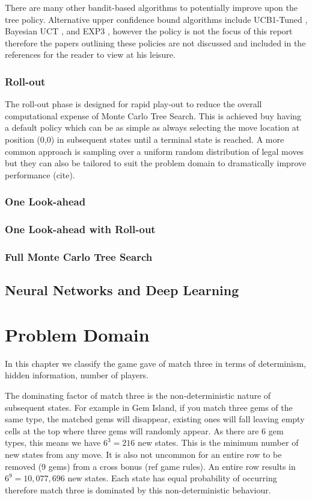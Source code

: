 \documentclass{bhamthesis}
\theoremstyle{definition}
\begin{document}
There are many other bandit-based algorithms to potentially improve upon the tree policy. Alternative upper confidence bound algorithms include UCB1-Tuned \cite{Auer2002}, Bayesian UCT \cite{Grunwald2010}, and EXP3 \cite{Auer1995} \cite{Audibert2009}, however the policy is not the focus of this report therefore the papers outlining these policies are not discussed and included in the references for the reader to view at his leisure.

\subsection{Roll-out}\label{s:rollOut}
The roll-out phase is designed for rapid play-out to reduce the overall computational expense of Monte Carlo Tree Search. This is achieved buy having a default policy which can be as simple as always selecting the move location at position (0,0) in subsequent states until a terminal state is reached. A more common approach is sampling over a uniform random distribution of legal moves but they can also be tailored to suit the problem domain to dramatically improve performance (cite).
\subsection{One Look-ahead}
\subsection{One Look-ahead with Roll-out}
\subsection{Full Monte Carlo Tree Search}
\section{Neural Networks and Deep Learning}


\chapter{Problem Domain}\label{ch:pb}
In this chapter we classify the game gave of match three in terms of determinism, hidden information, number of players.

The dominating factor of match three is the non-deterministic nature of subsequent states. For example in Gem Island, if you match three gems of the same type, the matched gems will disappear, existing ones will fall leaving empty cells at the top where three gems will randomly appear. As there are 6 gem types, this means we have $6^3 = 216$ new states. This is the minimum number of new states from any move. It is also not uncommon for an entire row to be removed (9 gems) from a cross bonus (ref game rules). An entire row results in $6^9=10,077,696$ new states. Each state has equal probability of occurring therefore match three is dominated by this non-deterministic behaviour.
\end{document}
